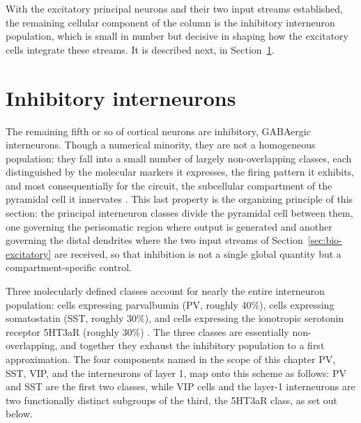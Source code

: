 With the excitatory principal neurons and their two input streams established, the remaining cellular component of the column is the inhibitory interneuron population, which is small in number but decisive in shaping how the excitatory cells integrate these streams. It is described next, in Section~\ref{sec:bio-inhibitory}.

\section{Inhibitory interneurons}
\label{sec:bio-inhibitory}

The remaining fifth or so of cortical neurons are inhibitory, GABAergic interneurons. Though a numerical minority, they are not a homogeneous population: they fall into a small number of largely non-overlapping classes, each distinguished by the molecular markers it expresses, the firing pattern it exhibits, and  most consequentially for the circuit, the subcellular compartment of the pyramidal cell it innervates \parencite{rudy2011, tremblay2016}. This last property is the organizing principle of this section: the principal interneuron classes divide the pyramidal cell between them, one governing the perisomatic region where output is generated and another governing the distal dendrites where the two input streams of Section~\ref{sec:bio-excitatory} are received, so that inhibition is not a single global quantity but a compartment-specific control.

Three molecularly defined classes account for nearly the entire interneuron population: cells expressing parvalbumin (PV, roughly 40\%), cells expressing somatostatin (SST, roughly 30\%), and cells expressing the ionotropic serotonin receptor 5HT3aR (roughly 30\%) \parencite{rudy2011}. The three classes are essentially non-overlapping, and together they exhaust the inhibitory population to a first approximation. The four components named in the scope of this chapter PV, SST, VIP, and the interneurons of layer 1, map onto this scheme as follows: PV and SST are the first two classes, while VIP cells and the layer-1 interneurons are two functionally distinct subgroups of the third, the 5HT3aR class, as set out below.

